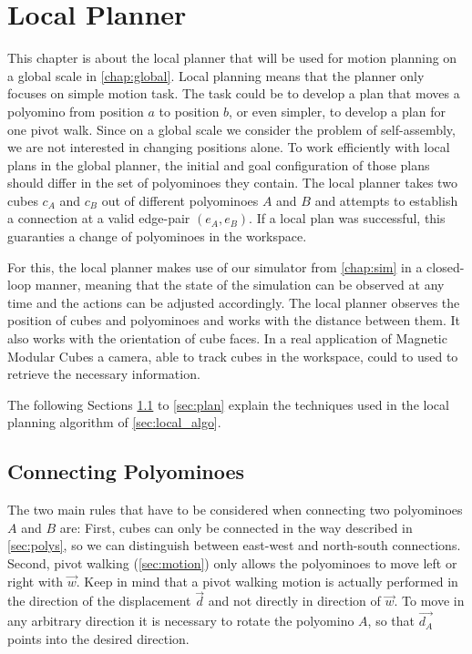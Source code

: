 \chapter{Local Planner}
\label{chap:local}

This chapter is about the local planner that will be used for motion planning on a global scale in \autoref{chap:global}.
Local planning means that the planner only focuses on simple motion task.
The task could be to develop a plan that moves a polyomino from position $a$ to position $b$, or even simpler, to develop a plan for one pivot walk.
Since on a global scale we consider the problem of self-assembly, we are not interested in changing positions alone.
To work efficiently with local plans in the global planner, the initial and goal configuration of those plans should differ in the set of polyominoes they contain.
The local planner takes two cubes $c_A$ and $c_B$ out of different polyominoes $A$ and $B$ and attempts to establish a connection at a valid edge-pair $(e_A, e_B)$.
If a local plan was successful, this guaranties a change of polyominoes in the workspace.

For this, the local planner makes use of our simulator from \autoref{chap:sim} in a closed-loop manner, meaning that the state of the simulation can be observed at any time and the actions can be adjusted accordingly.
The local planner observes the position of cubes and polyominoes and works with the distance between them.
It also works with the orientation of cube faces.
In a real application of Magnetic Modular Cubes a camera, able to track cubes in the workspace, could to used to retrieve the necessary information. 

The following Sections \ref{sec:connect} to \ref{sec:plan} explain the techniques used in the local planning algorithm of \autoref{sec:local_algo}.

\section{Connecting Polyominoes}
\label{sec:connect}

The two main rules that have to be considered when connecting two polyominoes $A$ and $B$ are:
First, cubes can only be connected in the way described in \autoref{sec:polys}, so we can distinguish between east-west and north-south connections.
Second, pivot walking (\autoref{sec:motion}) only allows the polyominoes to move left or right with $\vec{w}$.
Keep in mind that a pivot walking motion is actually performed in the direction of the displacement $\vec{d}$ and not directly in direction of $\vec{w}$.
To move in any arbitrary direction it is necessary to rotate the polyomino $A$, so that $\vec{d_A}$ points into the desired direction.

